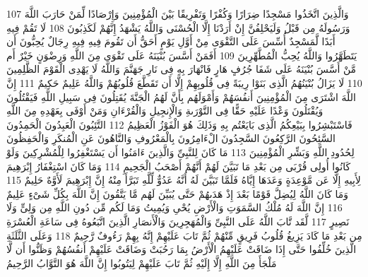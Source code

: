 \documentclass[20pt,a4paper]{article}
\begin{document}
{\tiny\colorbox{cl_aya}{107}} وَالَّذِينَ اتَّخَذُوا مَسْجِدًا ضِرَارًا وَكُفْرًا وَتَفْرِيقًا بَيْنَ الْمُؤْمِنِينَ وَإِرْصَادًا لِّمَنْ حَارَبَ اللَّهَ وَرَسُولَهُ مِن قَبْلُ وَلَيَحْلِفُنَّ إِنْ أَرَدْنَا إِلَّا الْحُسْنَى وَاللَّهُ يَشْهَدُ إِنَّهُمْ لَكَذِبُونَ
{\tiny\colorbox{cl_aya}{108}} لَا تَقُمْ فِيهِ أَبَدًا لَّمَسْجِدٌ أُسِّسَ عَلَى التَّقْوَى مِنْ أَوَّلِ يَوْمٍ أَحَقُّ أَن تَقُومَ فِيهِ فِيهِ رِجَالٌ يُحِبُّونَ أَن يَتَطَهَّرُوا وَاللَّهُ يُحِبُّ الْمُطَّهِّرِينَ
{\tiny\colorbox{cl_aya}{109}} أَفَمَنْ أَسَّسَ بُنْيَنَهُ عَلَى تَقْوَى مِنَ اللَّهِ وَرِضْوَنٍ خَيْرٌ أَم مَّنْ أَسَّسَ بُنْيَنَهُ عَلَى شَفَا جُرُفٍ هَارٍ فَانْهَارَ بِهِ فِى نَارِ جَهَنَّمَ وَاللَّهُ لَا يَهْدِى الْقَوْمَ الظَّلِمِينَ
{\tiny\colorbox{cl_aya}{110}} لَا يَزَالُ بُنْيَنُهُمُ الَّذِى بَنَوْا رِيبَةً فِى قُلُوبِهِمْ إِلَّا أَن تَقَطَّعَ قُلُوبُهُمْ وَاللَّهُ عَلِيمٌ حَكِيمٌ
{\tiny\colorbox{cl_aya}{111}} إِنَّ اللَّهَ اشْتَرَى مِنَ الْمُؤْمِنِينَ أَنفُسَهُمْ وَأَمْوَلَهُم بِأَنَّ لَهُمُ الْجَنَّةَ يُقَتِلُونَ فِى سَبِيلِ اللَّهِ فَيَقْتُلُونَ وَيُقْتَلُونَ وَعْدًا عَلَيْهِ حَقًّا فِى التَّوْرَىةِ وَالْإِنجِيلِ وَالْقُرْءَانِ وَمَنْ أَوْفَى بِعَهْدِهِ مِنَ اللَّهِ فَاسْتَبْشِرُوا بِبَيْعِكُمُ الَّذِى بَايَعْتُم بِهِ وَذَلِكَ هُوَ الْفَوْزُ الْعَظِيمُ
{\tiny\colorbox{cl_aya}{112}} التَّئِبُونَ الْعَبِدُونَ الْحَمِدُونَ السَّئِحُونَ الرَّكِعُونَ السَّجِدُونَ الْءَامِرُونَ بِالْمَعْرُوفِ وَالنَّاهُونَ عَنِ الْمُنكَرِ وَالْحَفِظُونَ لِحُدُودِ اللَّهِ وَبَشِّرِ الْمُؤْمِنِينَ
{\tiny\colorbox{cl_aya}{113}} مَا كَانَ لِلنَّبِىِّ وَالَّذِينَ ءَامَنُوا أَن يَسْتَغْفِرُوا لِلْمُشْرِكِينَ وَلَوْ كَانُوا أُولِى قُرْبَى مِن بَعْدِ مَا تَبَيَّنَ لَهُمْ أَنَّهُمْ أَصْحَبُ الْجَحِيمِ
{\tiny\colorbox{cl_aya}{114}} وَمَا كَانَ اسْتِغْفَارُ إِبْرَهِيمَ لِأَبِيهِ إِلَّا عَن مَّوْعِدَةٍ وَعَدَهَا إِيَّاهُ فَلَمَّا تَبَيَّنَ لَهُ أَنَّهُ عَدُوٌّ لِّلَّهِ تَبَرَّأَ مِنْهُ إِنَّ إِبْرَهِيمَ لَأَوَّهٌ حَلِيمٌ
{\tiny\colorbox{cl_aya}{115}} وَمَا كَانَ اللَّهُ لِيُضِلَّ قَوْمًا بَعْدَ إِذْ هَدَىهُمْ حَتَّى يُبَيِّنَ لَهُم مَّا يَتَّقُونَ إِنَّ اللَّهَ بِكُلِّ شَىْءٍ عَلِيمٌ
{\tiny\colorbox{cl_aya}{116}} إِنَّ اللَّهَ لَهُ مُلْكُ السَّمَوَتِ وَالْأَرْضِ يُحْىِ وَيُمِيتُ وَمَا لَكُم مِّن دُونِ اللَّهِ مِن وَلِىٍّ وَلَا نَصِيرٍ
{\tiny\colorbox{cl_aya}{117}} لَّقَد تَّابَ اللَّهُ عَلَى النَّبِىِّ وَالْمُهَجِرِينَ وَالْأَنصَارِ الَّذِينَ اتَّبَعُوهُ فِى سَاعَةِ الْعُسْرَةِ مِن بَعْدِ مَا كَادَ يَزِيغُ قُلُوبُ فَرِيقٍ مِّنْهُمْ ثُمَّ تَابَ عَلَيْهِمْ إِنَّهُ بِهِمْ رَءُوفٌ رَّحِيمٌ
{\tiny\colorbox{cl_aya}{118}} وَعَلَى الثَّلَثَةِ الَّذِينَ خُلِّفُوا حَتَّى إِذَا ضَاقَتْ عَلَيْهِمُ الْأَرْضُ بِمَا رَحُبَتْ وَضَاقَتْ عَلَيْهِمْ أَنفُسُهُمْ وَظَنُّوا أَن لَّا مَلْجَأَ مِنَ اللَّهِ إِلَّا إِلَيْهِ ثُمَّ تَابَ عَلَيْهِمْ لِيَتُوبُوا إِنَّ اللَّهَ هُوَ التَّوَّابُ الرَّحِيمُ
\end{document}
